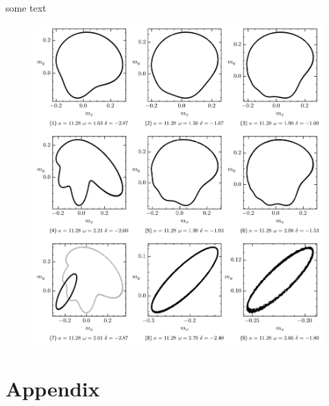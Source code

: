 \documentclass{article}
\begin{document}
some text
\begin{figure}[H]
    \vspace{-0.35cm}
    \hspace*{-1.3cm}
    \includegraphics{pictures/lc_traj_kcut.png}
\end{figure}

\newpage
\appendix
\section*{Appendix}
\end{document}
